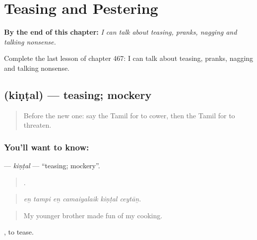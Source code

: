 
\chapter{Teasing and Pestering}
\label{ch:ta-teasing-and-pestering}

\begin{chapteropening}
\textbf{By the end of this chapter:} \emph{I can talk about teasing, pranks, nagging and talking nonsense.}

Complete the last lesson of chapter 467: I can talk about teasing, pranks, nagging and talking nonsense.
\end{chapteropening}

\section[\texorpdfstring{\ta{கிண்டல்} (kiṇṭal)}{கிண்டல் (kiṇṭal)}]{ (kiṇṭal) — teasing; mockery}

\label{lesson:TA-C467-kintal}



\begin{quote}
Before the new one: say the Tamil for to cower, then the Tamil for to threaten.
\end{quote}

\subsection*{You'll want to know: }
\textbf{} — \emph{kiṇṭal} — \textquotedblleft{}teasing; mockery\textquotedblright{}.

\begin{quote}
     .
\end{quote}

\begin{quote}
\emph{eṉ tampi eṉ camaiyalaik kiṇṭal ceytāṉ.}
\end{quote}

\begin{quote}
My younger brother made fun of my cooking.
\end{quote}

 , to tease.

